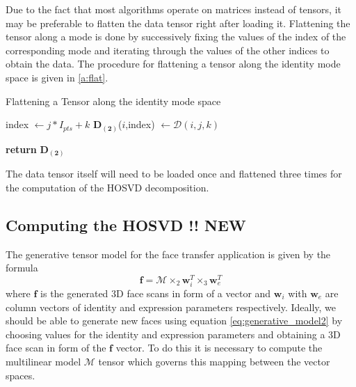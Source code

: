 \documentclass[11pt,a4paper]{report}
\begin{document}
Due to the fact that most algorithms operate on matrices instead of tensors, it
may be preferable to flatten the data tensor right after loading it. Flattening
the tensor along a mode is done by successively fixing the values of the index of
the corresponding mode and iterating through the values of the other indices to
obtain the data. The procedure for flattening a tensor along the identity mode space is given in
\ref{a:flat}.

\begin{algorithm}\label{a:load}
\caption{Flattening a Tensor along the identity mode space}
\begin{algorithmic}[1]
 


\State index $\gets j*I_{pts} + k$
\State $\mathbf{D_{(2)}}$($i$,index) $\gets \mathcal{D}(i,j,k)$

\EndFor
\EndFor
\EndFor
\State \textbf{return} $\mathbf{D_{(2)}}$ 
\EndProcedure
\end{algorithmic}
\end{algorithm}

The data tensor itself will need to be loaded once and flattened three times for
the computation of the HOSVD decomposition. 

\subsection{Computing the HOSVD !! NEW}
The generative tensor model for the face transfer application is given by the formula 
\begin{equation} \label{eq:generative_model2}
\mathbf{f} = \mathcal{M} \times_2 \mathbf{w}_i^T \times_3 \mathbf{w}_e^T
\end{equation}
where $\mathbf{f}$ is the generated 3D face scans in form of a vector and
$\mathbf{w}_i$ with $\mathbf{w}_e$ are column vectors of identity and expression
parameters respectively. Ideally, we should be able to generate new faces using
equation \ref{eq:generative_model2} by choosing values for the identity and
expression parameters and obtaining a 3D face scan in form of the $\mathbf{f}$
vector. To do this it is necessary to compute the multilinear model
$\mathcal{M}$ tensor which governs this mapping between the vector spaces.
\end{document}
